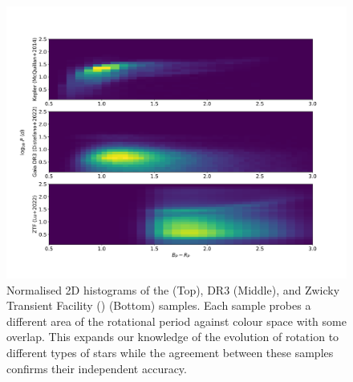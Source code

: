 \begin{figure}[h]
    \includegraphics[width=\textwidth]{Figures/intro_figures/rot_comp.png}
    \caption{Normalised 2D histograms of the \kepler{} \citep{mcquillan_rotation_2014} (Top), \gaia{} DR3 \citep{distefano_gaia_2022} (Middle), and Zwicky Transient Facility (\ZTF) \citep{lu_bridging_2022} (Bottom) samples. Each sample probes a different area of the rotational period against colour space with some overlap. This expands our knowledge of the evolution of rotation to different types of stars while the agreement between these samples confirms their independent accuracy.}
    \label{fig:rot_comp}
\end{figure}

